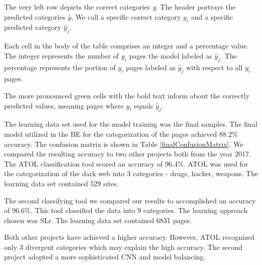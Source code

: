 \begin{table}
{The very left row depicts the correct categories \textit{y}. The header portrays the predicted categories $\hat{y}$. We call a specific correct category $y_i$ and a specific predicted category $\hat{y}_j$. 

Each cell in the body of the table comprises an integer and a percentage value. The integer represents the number of  $y_i$ pages the model labeled as $\hat{y}_j$. The percentage represents the portion of ${y_i}$ pages labeled as $\hat{y}_j$ with respect to all ${y_i}$ pages. 

The more pronounced green cells with the bold text inform about the correctly predicted values, meaning pages where $y_i$ equals $\hat{y}_j$.}
\label{finalConfusionMatrix}
\end{table}

The learning data set used for the model training was the final samples. The final model utilized in the BE for the categorization of the pages achieved 88.2\% accuracy. The confusion matrix is shown in Table \ref{finalConfusionMatrix}. We compared the resulting accuracy to two other projects both from the year 2017. The ATOL \cite{atol} classification tool scored an accuracy of 96.4\%. ATOL was used for the categorization of the dark web into 3 categories - drugs, hacker, weapons. The learning data set contained 529 sites. 

The second classifying tool \cite{classificationProject} we compared our results to accomplished an accuracy of 96.6\%. This tool classified the data into 9 categories. The learning approach chosen was SLr. The learning data set contained 6831 pages. 

Both other projects have achieved a higher accuracy. However, ATOL recognized only 3 divergent categories which may explain the high accuracy. The second project adopted a more sophisticated CNN and model balancing. 

